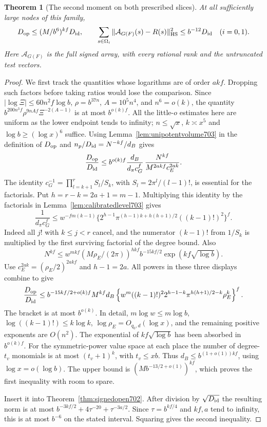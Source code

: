 \documentclass[a4paper,11pt]{article}
\newtheorem{theorem}[proposition]{Theorem}
\theoremstyle{definition}
\theoremstyle{remark}
\numberwithin{equation}{section}
\begin{document}
\begin{theorem}[The second moment on both prescribed slices]\leavevmode
\label{thm:markedsecond703}
At all sufficiently large nodes of this family,
\[
    D_{\rm op}\le (M/b^6)^{kf}D_{\rm id},\qquad
    \sum_{s\in\Omega_i}\|\mathcal A_{G(F)}(s)-R(s)\|_{\rm HS}^2
                      \le b^{-12}D_{\rm id}\quad(i=0,1).
\]
Here \(\mathcal A_{G(F)}\) is the full signed array, with every
rational rank and the untruncated test vectors.
\end{theorem}
\begin{proof}
We first track the quantities whose logarithms are of order
\(akf\). Dropping such factors before taking ratios would lose
the comparison. Since \(|\log\Xi|\le 60n^2 f\log b\),
\(\rho=b^{37n}\), \(A=10^5 n^4\), and \(n^6=o(k)\), the
quantity \(b^{200n^3f}\rho^{9nAf}\Xi^{-2(A-1)}\) is at most
\(b^{o(k)f}\). All the little-\(o\) estimates here are uniform
as the lower endpoint tends to infinity; \(n\le\sqrt{x}\),
\(k\asymp x^5\) and \(\log b\ge(\log x)^6\) suffice. Using
Lemma~\ref{lem:unipotentvolume703} in the definition of
\(D_{\rm op}\) and \(n_p/D_{\rm id}=N^{-kf}/d_B\) gives
\[
 \frac{D_{\rm op}}{D_{\rm id}}
  \le b^{o(k)f}
       \frac{d_B}{d_\pi c_G^f}\,
       \frac{N^{kf}}{M^{2akf}c_E^{2ak}} .
\]
The identity \(c_G^{-1}=\prod_{l=k+1}^{r}S_l/S_k\), with
\(S_l=2\pi^l/(l-1)!\), is essential for the factorials.
Put \(h=r-k=2a+1=m-1\). Multiplying this identity by the
factorials in Lemma~\ref{lem:calibratedlevel703} gives
\[
 \frac1{d_\pi c_G^f}
 \le w^{-fm(k-1)}
   \big\{2^{h-1}\pi^{(h-1)k+h(h+1)/2}((k-1)!)^2\big\}^f .
\]
Indeed all \(j!\) with \(k\le j<r\) cancel, and the numerator
\((k-1)!\) from \(1/S_k\) is multiplied by the first surviving
factorial of the degree bound. Also
\[
     N^{kf}\le
       w^{mkf}(M\rho_E/(2\pi))^{hkf}
       b^{-15kf/2}\exp(kf\sqrt{\log b}) .
\]
Use \(c_E^{2ak}=(\rho_E/2)^{2akf}\) and \(h-1=2a\).
All powers in these three displays combine to give
\[
 \frac{D_{\rm op}}{D_{\rm id}}\le
 b^{-15kf/2+o(k)f}M^{kf}d_B
 \left\{
   w^m ((k-1)!)^2
   2^{h-1-k}\pi^{h(h+1)/2-k}\rho_E^k
 \right\}^{f}.
\]
The bracket is at most \(b^{o(k)}\). In detail,
\(m\log w\le m\log b\), \(\log((k-1)!)\le k\log k\),
\(\log\rho_E=O_{q_0,d}(\log x)\), and the remaining positive
exponents are \(O(n^2)\). The exponential of
\(kf\sqrt{\log b}\) has been absorbed in \(b^{o(k)f}\).
For the symmetric-power value space at each place the number
of degree-\(t_v\) monomials is at most \((t_v+1)^k\), with
\(t_v\le xb\). Thus \(d_B\le b^{(1+o(1))kf}\), using
\(\log x=o(\log b)\). The upper bound is
\((M b^{-13/2+o(1)})^{kf}\), which proves the first
inequality with room to spare.

Insert it into Theorem~\ref{thm:signedopen702}. After division
by \(\sqrt{D_{\rm id}}\) the resulting norm is at most
\(b^{-3kf/2}+4\tau^{-20}+\tau^{-3a/2}\). Since
\(\tau=b^{kf/4}\) and \(kf,a\) tend to infinity, this is at
most \(b^{-6}\) on the stated interval. Squaring gives the
second inequality.
\end{proof}
\end{document}
